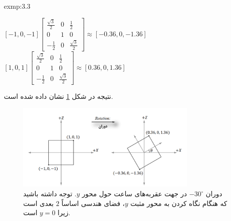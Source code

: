 {\begin{spacing}{1.5}
\begin{exmp}{exmp:3.3}
            \begin{center}
                $[-1,0,-1]\begin{bmatrix}
                              \frac{\displaystyle \sqrt{\displaystyle 3}}{\displaystyle 2} & 0 & \frac{\displaystyle 1}{\displaystyle 2}                      \\
                              0                                                            & 1 & 0                                                            \\
                              -\frac{\displaystyle 1}{\displaystyle 2}                     & 0 & \frac{\displaystyle \sqrt{\displaystyle 3}}{\displaystyle 2}
                \end{bmatrix}\approx[-0.36,0,-1.36]$\\
                $[1,0,1]\begin{bmatrix}
                            \frac{\displaystyle \sqrt{\displaystyle 3}}{\displaystyle 2} & 0 & \frac{\displaystyle 1}{\displaystyle 2}                      \\
                            0                                                            & 1 & 0                                                            \\
                            -\frac{\displaystyle 1}{\displaystyle 2}                     & 0 & \frac{\displaystyle \sqrt{\displaystyle 3}}{\displaystyle 2}
                \end{bmatrix}\approx[0.36,0,1.36]$
            \end{center}

            نتیجه در شکل \ref{fig:4.Session.1.3.4} نشان داده شده است.

            \begin{figure}[H]
                \centering
                \setlength{\belowcaptionskip}{-10pt}
                \includegraphics[width=0.8\textwidth]{Images/4/3/4.Session.1.3.4}
                \caption {دوران $-30^\circ$ در جهت عقربه‌های ساعت حول محور $y$.
                توجه داشته باشید که هنگام نگاه کردن به محور مثبت $y$، فضای هندسی اساساً $2$ بعدی است زیرا $y=0$ است. \textbf{\vspace{20pt}}}
                \label{fig:4.Session.1.3.4}
            \end{figure}
        \end{exmp}
    \end{spacing}
}


